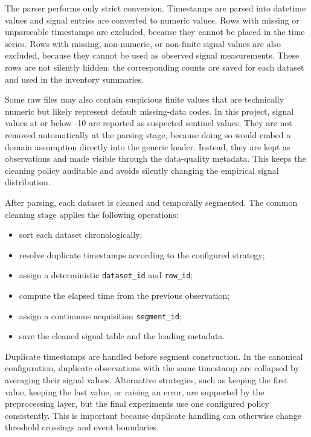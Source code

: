 The parser performs only strict conversion. Timestamps are parsed into datetime
values and signal entries are converted to numeric values. Rows with missing or
unparseable timestamps are excluded, because they cannot be placed in the time
series. Rows with missing, non-numeric, or non-finite signal values are also
excluded, because they cannot be used as observed signal measurements. These
rows are not silently hidden: the corresponding counts are saved for each
dataset and used in the inventory summaries.

Some raw files may also contain suspicious finite values that are technically
numeric but likely represent default missing-data codes. In this project,
signal values at or below -10 are reported as suspected sentinel values. They
are not removed automatically at the parsing stage, because doing so would
embed a domain assumption directly into the generic loader. Instead, they are
kept as observations and made visible through the data-quality metadata. This
keeps the cleaning policy auditable and avoids silently changing the empirical
signal distribution.

After parsing, each dataset is cleaned and temporally segmented. The common
cleaning stage applies the following operations:

\begin{itemize}
  \item sort each dataset chronologically;
  \item resolve duplicate timestamps according to the configured strategy;
  \item assign a deterministic \texttt{dataset\_id} and \texttt{row\_id};
  \item compute the elapsed time from the previous observation;
  \item assign a continuous acquisition \texttt{segment\_id};
  \item save the cleaned signal table and the loading metadata.
\end{itemize}

Duplicate timestamps are handled before segment construction. In the canonical
configuration, duplicate observations with the same timestamp are collapsed by
averaging their signal values. Alternative strategies, such as keeping the
first value, keeping the last value, or raising an error, are supported by the
preprocessing layer, but the final experiments use one configured policy
consistently. This is important because duplicate handling can otherwise
change threshold crossings and event boundaries.

